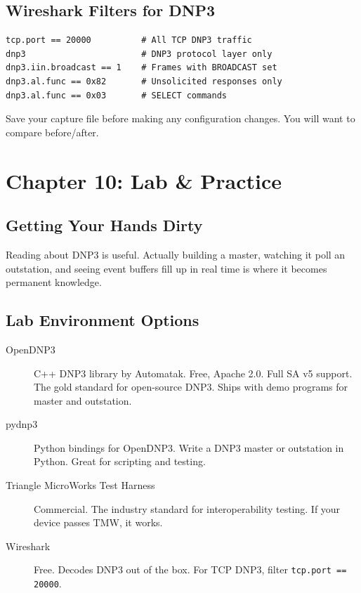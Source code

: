 \documentclass[11pt,twoside]{article}
\begin{document}
\subsection{Wireshark Filters for DNP3}

\begin{verbatim}
tcp.port == 20000          # All TCP DNP3 traffic
dnp3                       # DNP3 protocol layer only
dnp3.iin.broadcast == 1    # Frames with BROADCAST set
dnp3.al.func == 0x82       # Unsolicited responses only
dnp3.al.func == 0x03       # SELECT commands
\end{verbatim}

Save your capture file before making any configuration changes. You will want to compare before/after.

\section{Chapter 10: Lab \& Practice}

\subsection{Getting Your Hands Dirty}

Reading about DNP3 is useful. Actually building a master, watching it poll an outstation, and seeing event buffers fill up in real time is where it becomes permanent knowledge.

\subsection{Lab Environment Options}

\begin{description}
  \item[OpenDNP3] C++ DNP3 library by Automatak. Free, Apache 2.0. Full SA v5 support. The gold standard for open-source DNP3. Ships with demo programs for master and outstation.
  \item[pydnp3] Python bindings for OpenDNP3. Write a DNP3 master or outstation in Python. Great for scripting and testing.
  \item[Triangle MicroWorks Test Harness] Commercial. The industry standard for interoperability testing. If your device passes TMW, it works.
  \item[Wireshark] Free. Decodes DNP3 out of the box. For TCP DNP3, filter \texttt{tcp.port == 20000}.
\end{description}
\end{document}
